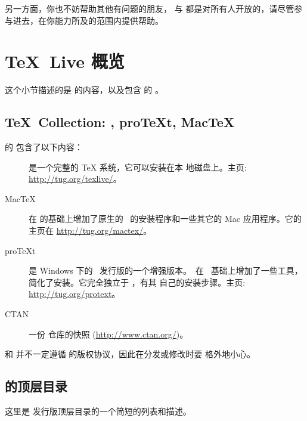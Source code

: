 \documentclass{article}
\begin{document}
另一方面，你也不妨帮助其他有问题的朋友， 与
 都是对所有人开放的，请尽管参与进去，在你能力所及的范围内提供帮助。

\section{\protect\TeX\protect\ Live 概览}
\label{sec:overview-tl}

这个小节描述的是 \TL{} 的内容，以及包含 \TL{} 的 \TK{}。

\subsection{\protect\TeX\protect\ Collection: \protect\TL,
            pro\protect\TeX{}t, Mac\protect\TeX}
\label{sec:tl-coll-dists}

\TK{} 的 \DVD{} 包含了以下内容：

\begin{description}

\item [\TL] 是一个完整的 \TeX{} 系统，它可以安装在本
地磁盘上。主页: \url{http://tug.org/texlive/}。

\item [Mac\TeX] 在 \TL{} 的基础上增加了原生的 \MacOSX\ 的安装程序和一些其它的
Mac 应用程序。它的主页在 \url{http://tug.org/mactex/}。

\item [pro\TeX{}t] 是 Windows 下的 \MIKTEX\ 发行版的一个增强版本。\ProTeXt\ 在
\MIKTEX\ 基础上增加了一些工具，简化了安装。它完全独立于 \TL{}，有其
自己的安装步骤。主页: \url{http://tug.org/protext}。

\item [CTAN] 一份 \CTAN{} 仓库的快照 (\url{http://www.ctan.org/})。

\end{description}

\CTAN{} 和  并不一定遵循 \TL{} 的版权协议，因此在分发或修改时要
格外地小心。

\subsection{\protect\TL{} 的顶层目录}
\label{sec:tld}

这里是 \TL{} 发行版顶层目录的一个简短的列表和描述。
\end{document}
